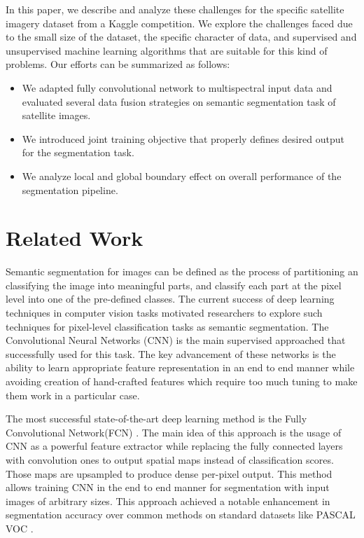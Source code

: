 \documentclass[10pt,twocolumn,letterpaper]{article}
\begin{document}
In this paper, we describe and analyze these challenges for the specific satellite imagery dataset from a Kaggle competition.  We explore the challenges faced due to the small size of the dataset, the specific character of data, and supervised and unsupervised machine learning algorithms that are suitable for this kind of problems. Our efforts  can be summarized as follows: 
\begin{itemize}
\item We adapted fully convolutional network to multispectral input data and evaluated several data fusion strategies on semantic segmentation task of satellite images. 

\item We introduced joint training objective that properly defines desired output for the segmentation task.

\item We analyze local and global boundary effect on overall performance of the segmentation pipeline. 

\end{itemize} 


\section{Related Work}
\label{section:related_work}
Semantic segmentation for images can be defined as the process of partitioning an classifying the image into meaningful parts, and classify each part at the pixel level into one of the pre-defined classes. The current success of deep learning techniques in computer vision tasks motivated researchers to explore such techniques for pixel-level classification tasks as semantic segmentation. The Convolutional Neural Networks (CNN) is the main supervised approached that successfully used for this task. The key advancement of these networks is the ability to learn appropriate feature representation in an end to end manner while avoiding creation of hand-crafted features which require too much tuning to make them work in a particular case.    

The most successful state-of-the-art deep learning method is the Fully Convolutional Network(FCN) \cite{fcn}.  The main idea of this approach is the usage of CNN as a powerful feature extractor while replacing the fully connected layers with convolution ones to output spatial maps instead of classification scores. Those maps are upsampled to produce dense per-pixel output. This method allows training CNN in the end to end manner for segmentation with input images of arbitrary sizes. This approach achieved a notable enhancement in segmentation accuracy over common methods on standard datasets like PASCAL VOC \cite{pascal}.
\end{document}
